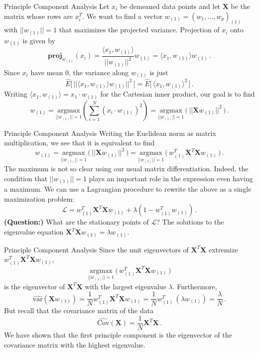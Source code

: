 \documentclass[10pt, table, dvipsnames,xcdraw,handout]{beamer}
\newcommand{\bfX}{\ensuremath{\mathbf{X}}}
\begin{document}
\begin{frame}[fragile]{Principle Component Analysis}
Let $x_i$ be demeaned data points and let $\bfX$ be the matrix whose rows are $x_i^T$. \pause We want to find a vector $w_{(1)} = (w_1,\ldots, w_p)_{(1)}$ with $||w_{(1)}|| = 1$ that maximizes the projected variance. Projection of $x_i$ onto $w_{(1)}$ is given by
$$
\textbf{proj}_{w_{(1)}} (x_i) = \frac{\langle x_1, w_{(1)}\rangle}{||w_{(1)}||^2}w_{(1)} = \langle x_1, w_{(1)}\rangle w_{(1)}\,.
$$\pause
Since $x_i$ have mean 0, the variance along $w_{(1)}$ is just 
$$
\widehat{E}\big[\,|| \langle x_1, w_{(1)}\rangle w_{(1)} ||^2\,\big] =\widehat{E}\big[\,\langle x_1, w_{(1)}\rangle^2\,\big]  \,.
$$\pause
Writing $\langle x_1, w_{(1)}\rangle = x_1\cdot w_{(1)}$ for the Cartesian inner product, our goal is to find
$$
w_{(1)} = \underset{||w_{(1)}||=1}{\text{argmax}}\left( \sum_{i=1}^N (x_i\cdot w_{(1)})^2  \right) 
= 
\underset{||w_{(1)}||=1}{\text{argmax}} \,\big(\,||\bfX w_{(1)}||^2\,\big)\,.
$$ 
\end{frame}




\begin{frame}[fragile]{Principle Component Analysis}
Writing the Euclidean norm as matrix multiplication, we see that it is equivalent to find
$$
w_{(1)} =
\underset{||w_{(1)}||=1}{\text{argmax}} \,\big(\,||\bfX w_{(1)}||^2\,\big)
=
\underset{||w_{(1)}||=1}{\text{argmax}} \,\big(\,w_{(1)}^T\bfX^T\bfX w_{(1)}\,\big)\,.
$$ \pause
The maximum is not so clear using our usual matrix differentiation. Indeed, the condition that $||w_{(1)}|| = 1$ plays an important role in the expression even having a maximum. We can use a Lagrangian procedure to rewrite the above as a single maximization problem:
$$
\mathcal{L} = w_{(1)}^T\bfX^T\bfX w_{(1)} + \lambda (1-w_{(1)}^Tw_{(1)} )\,.
$$
\textbf{(Question:)} What are the stationary points of $\mathcal{L} $?  \pause The solutions to the eigenvalue equation $\bfX^T\bfX w_{(1)}  = \lambda w_{(1)}$.


\end{frame}


\begin{frame}[fragile]{Principle Component Analysis}
Since the unit eigenvectors of $\bfX^T\bfX$ extremize $w_{(1)}^T\bfX^T\bfX w_{(1)}$, 
$$
\underset{||w_{(1)}||=1}{\text{argmax}} \,\big(\,w_{(1)}^T\bfX^T\bfX w_{(1)}\,\big)
$$\pause
is the eigenvector of $\bfX^T\bfX$ with the largest eigenvalue $\lambda$. \pause Furthermore,
$$
\widehat{\text{var}}(\mathbf{X}w_{(1)}) = \frac{1}{N}w_{(1)}^T\bfX^T\bfX w_{(1)} = \frac{1}{N}w_{(1)}^T\,(\lambda w_{(1)}) = \frac{\lambda}{N}\,.
$$\pause
But recall that the covariance matrix of the data
$$
\widehat{\text{Cov}}(\bfX) = \frac{1}{N} \bfX^T\bfX\,.
$$
We have shown that the first principle component is the eigenvector of the covariance matrix with the highest eigenvalue. 
\end{frame}
\end{document}
